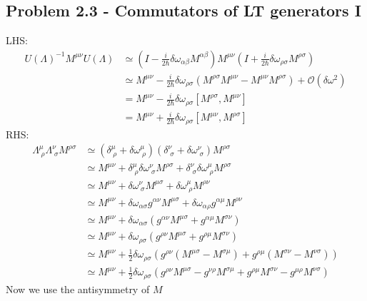 \documentclass[10pt,a4paper]{book}
\theoremstyle{definition}
\begin{document}
\subsection{Problem 2.3 - Commutators of LT generators I}
LHS:
\begin{align}
U(\Lambda)^{-1}M^{\mu\nu}U(\Lambda)
&\simeq\left(I-\frac{i}{2\hbar}\delta\omega_{\alpha\beta}M^{\alpha\beta}\right)M^{\mu\nu}\left(I+\frac{i}{2\hbar}\delta\omega_{\rho\sigma}M^{\rho\sigma}\right)\\
&\simeq M^{\mu\nu}-\frac{i}{2\hbar}\delta\omega_{\rho\sigma}(M^{\rho\sigma}M^{\mu\nu}-M^{\mu\nu}M^{\rho\sigma})+\mathcal{O}(\delta\omega^2)\\
&= M^{\mu\nu}-\frac{i}{2\hbar}\delta\omega_{\rho\sigma}[M^{\rho\sigma},M^{\mu\nu}]\\
&= M^{\mu\nu}+\frac{i}{2\hbar}\delta\omega_{\rho\sigma}[M^{\mu\nu},M^{\rho\sigma}]
\end{align}
RHS:
\begin{align}
\Lambda^{\mu}_{\;\rho}\Lambda^\nu_{\;\sigma}M^{\rho\sigma}
&\simeq\left(\delta^{\mu}_{\;\rho}+\delta\omega^{\mu}_{\;\rho}\right)\left(\delta^{\nu}_{\;\sigma}+\delta\omega^{\nu}_{\;\sigma}\right)M^{\rho\sigma}\\
&\simeq M^{\mu\nu}+\delta^\mu_{\;\rho}\delta\omega^\nu_{\;\sigma}M^{\rho\sigma}+\delta^\nu_{\;\sigma}\delta\omega^\mu_{\;\rho}M^{\rho\sigma}\\
&\simeq M^{\mu\nu}+\delta\omega^\nu_{\;\sigma}M^{\mu\sigma}+\delta\omega^\mu_{\;\rho}M^{\rho\nu}\\
&\simeq M^{\mu\nu}+\delta\omega_{\alpha\sigma}g^{\alpha\nu}M^{\mu\sigma}+\delta\omega_{\alpha\rho}g^{\alpha\mu}M^{\rho\nu}\\
&\simeq M^{\mu\nu}+\delta\omega_{\alpha\sigma}(g^{\alpha\nu}M^{\mu\sigma}+g^{\alpha\mu}M^{\sigma\nu})\\
&\simeq M^{\mu\nu}+\delta\omega_{\rho\sigma}(g^{\rho\nu}M^{\mu\sigma}+g^{\rho\mu}M^{\sigma\nu})\\
&\simeq M^{\mu\nu}+\frac{1}{2}\delta\omega_{\rho\sigma}\left(g^{\rho\nu}(M^{\mu\sigma}-M^{\sigma\mu})+g^{\rho\mu}(M^{\sigma\nu}-M^{\nu\sigma})\right)\\
&\simeq M^{\mu\nu}+\frac{1}{2}\delta\omega_{\rho\sigma}\left(g^{\rho\nu}M^{\mu\sigma}-g^{\nu\rho}M^{\sigma\mu}+g^{\rho\mu}M^{\sigma\nu}-g^{\mu\rho}M^{\nu\sigma}\right)
\end{align}
Now we use the antisymmetry of $M$ 
\end{document}
